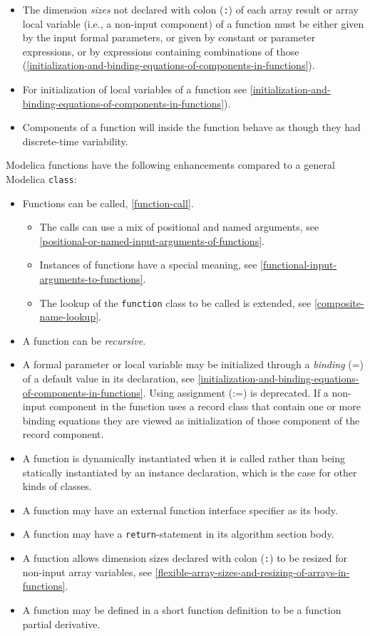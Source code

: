 \begin{itemize}
\item
  The dimension \emph{sizes} not declared with colon (\lstinline!:!) of each array result or array local variable (i.e., a non-input component) of a function must be either given by the input formal parameters, or given by constant or parameter expressions, or by expressions containing combinations of those (\cref{initialization-and-binding-equations-of-components-in-functions}).
\item
  For initialization of local variables of a function see \cref{initialization-and-binding-equations-of-components-in-functions}).
\item
  Components of a function will inside the function behave as though
  they had discrete-time variability.
\end{itemize}

Modelica functions have the following enhancements compared to a general
Modelica \lstinline!class!:
\begin{itemize}
\item
  Functions can be called, \cref{function-call}.

  \begin{itemize}
  \item
    The calls can use a mix of positional and named arguments, see
    \cref{positional-or-named-input-arguments-of-functions}.
  \item
    Instances of functions have a special meaning, see \cref{functional-input-arguments-to-functions}.
  \item
    The lookup of the \lstinline!function! class to be called is extended, see \cref{composite-name-lookup}.
  \end{itemize}
\item
  A function can be \emph{recursive}.
\item
  A formal parameter or local variable may be initialized through a
  \emph{binding} (=) of a default value in its declaration,
  see \cref{initialization-and-binding-equations-of-components-in-functions}.
  Using assignment (:=) is deprecated. If a non-input component in the
  function uses a record class that contain one or more binding
  equations they are viewed as initialization of those component of the
  record component.
\item
  A function is dynamically instantiated when it is called rather than
  being statically instantiated by an instance declaration, which is the
  case for other kinds of classes.
\item
  A function may have an external function interface specifier as its
  body.
\item
  A function may have a \lstinline!return!-statement in its algorithm section body.
\item
  A function allows dimension sizes declared with colon (\lstinline!:!) to be resized for non-input array variables, see \cref{flexible-array-sizes-and-resizing-of-arrays-in-functions}.
\item
  A function may be defined in a short function definition to be a
  function partial derivative.
\end{itemize}

